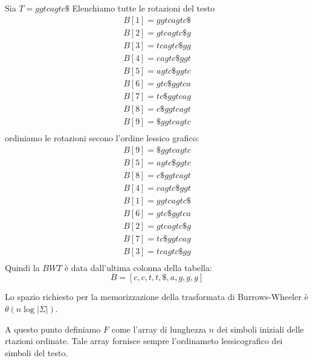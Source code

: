 \begin{esempio}
    Sia $T = ggtcagtc\$$
    Elenchiamo tutte le rotazioni del testo
    \begin{equation}
        \begin{array}{c}
            B[1] = ggtcagtc\$ \\
            B[2] = gtcagtc\$g \\
            B[3] = tcagtc\$gg \\
            B[4] = cagtc\$ggt \\
            B[5] = agtc\$ggtc \\
            B[6] = gtc\$ggtca \\
            B[7] = tc\$ggtcag \\
            B[8] = c\$ggtcagt \\
            B[9] = \$ggtcagtc \\
        \end{array}
    \end{equation}
    ordiniamo le rotazioni secono l'ordine lessico grafico:
    \begin{equation}
        \begin{array}{c}
            B[9] = \$ggtcagtc \\
            B[5] = agtc\$ggtc \\
            B[8] = c\$ggtcagt \\
            B[4] = cagtc\$ggt \\
            B[1] = ggtcagtc\$ \\
            B[6] = gtc\$ggtca \\
            B[2] = gtcagtc\$g \\
            B[7] = tc\$ggtcag \\
            B[3] = tcagtc\$gg \\
        \end{array}
    \end{equation}
    Quindi la $BWT$ è data dall'ultima colonna della tabella:
    \begin{equation}
        B = [c, c, t, t, \$, a, g, g, g]
    \end{equation}
\end{esempio}
Lo spazio richiesto per la memorizzazione della trasformata di Burrows-Wheeler è
$\theta(n \log |\Sigma|)$.

A questo punto definiamo $F$ come l'array di lunghezza $n$ dei simboli iniziali
delle rtazioni ordinate. Tale array fornisce sempre l'ordinameto lessicografico
dei simboli del testo.

